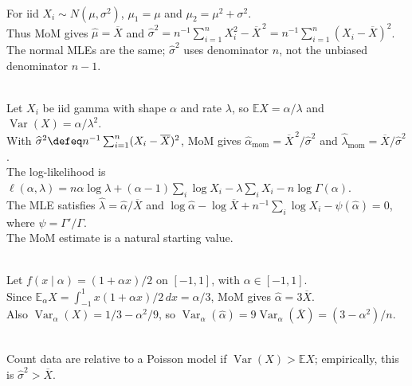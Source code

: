 \begin{example} \label{ex:normal-moments-and-mle} \\
For iid $X_i\sim N(\mu,\sigma^2)$, $\mu_1=\mu$ and $\mu_2=\mu^2+\sigma^2$.\\
Thus MoM gives $\widehat{\mu}=\overline{X}$ and $\widehat{\sigma}^2=n^{-1}\sum_{i=1}^{n}X_i^2-\overline{X}^{\,2}=n^{-1}\sum_{i=1}^{n}(X_i-\overline{X})^2$.\\
The normal MLEs are the same; $\widehat{\sigma}^2$ uses denominator $n$, not the unbiased denominator $n-1$.
\end{example}

\begin{example} \label{ex:gamma-moments-and-likelihood-equations} \\
Let $X_i$ be iid gamma with shape $\alpha$ and rate $\lambda$, so $\mathbb{E}X=\alpha/\lambda$ and $\operatorname{Var}(X)=\alpha/\lambda^2$.\\
With $\widehat{\sigma}^2\defeq n^{-1}\sum_{i=1}^{n}(X_i-\overline{X})^2$, MoM gives $\widehat{\alpha}_{\mathrm{mom}}=\overline{X}^{\,2}/\widehat{\sigma}^2$ and $\widehat{\lambda}_{\mathrm{mom}}=\overline{X}/\widehat{\sigma}^2$.\\
The log-likelihood is $\ell(\alpha,\lambda)=n\alpha\log\lambda+(\alpha-1)\sum_i\log X_i-\lambda\sum_iX_i-n\log\Gamma(\alpha)$.\\
The MLE satisfies $\widehat{\lambda}=\widehat{\alpha}/\overline{X}$ and $\log\widehat{\alpha}-\log\overline{X}+n^{-1}\sum_i\log X_i-\psi(\widehat{\alpha})=0$, where $\psi=\Gamma'/\Gamma$.\\
The MoM estimate is a natural starting value.
\end{example}

\begin{example} \label{ex:angular-distribution-method-of-moments} \\
Let $f(x\mid\alpha)=(1+\alpha x)/2$ on $[-1,1]$, with $\alpha\in[-1,1]$.\\
Since $\mathbb{E}_\alpha X=\int_{-1}^{1}x(1+\alpha x)/2\,dx=\alpha/3$, MoM gives $\widehat{\alpha}=3\overline{X}$.\\
Also $\operatorname{Var}_\alpha(X)=1/3-\alpha^2/9$, so $\operatorname{Var}_\alpha(\widehat{\alpha})=9\operatorname{Var}_\alpha(\overline{X})=(3-\alpha^2)/n$.
\end{example}

\begin{definition} \label{def:overdispersed-counts} \\
Count data are  relative to a Poisson model if $\operatorname{Var}(X)>\mathbb{E}X$; empirically, this is $\widehat{\sigma}^2>\overline{X}$.
\end{definition}

